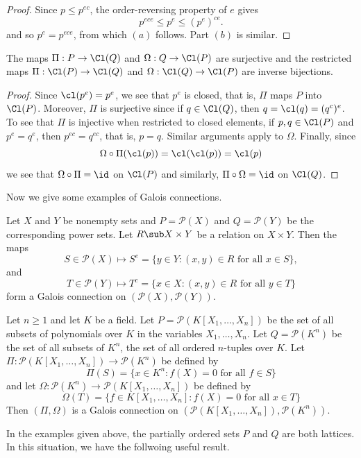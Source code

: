 \begin{proof}
Since $p\leq p^{ec}$, the order-reversing property of $e$ gives
\[p^{ece}\leq p^e\leq(p^{e})^{ce}.\]
and so $p^e=p^{ece}$, from which $(a)$ follows. Part $(b)$ is similar.
\end{proof}
\begin{theorem}
The maps $\Pi:P\to\Cl(Q)$ and $\Omega:Q\to\Cl(P)$ are surjective and the restricted maps $\Pi:\Cl(P)\to \Cl(Q)$ and $\Omega:\Cl(Q)\to\Cl(P)$ are inverse bijections.
\end{theorem}
\begin{proof}
Since $\cl(p^e)=p^e$, we see that $p^e$ is closed, that is, $\Pi$ maps $P$ into $\Cl(P)$. Moreover, $\Pi$ is surjective since if $q\in\Cl(Q)$, then $q=\cl(q)=(q^{c})^e$. To see that $\Pi$ is injective when restricted to closed elements, if $p,q\in\Cl(P)$ and $p^e=q^e$, then $p^{ec}=q^{ec}$, that is, $p=q$. Similar arguments apply to $\Omega$. Finally, since
\[\Omega\circ\Pi(\cl(p))=\cl(\cl(p))=\cl(p)\]
we see that $\Omega\circ\Pi=\id$ on $\Cl(P)$ and similarly, $\Pi\circ\Omega=\id$ on $\Cl(Q)$.
\end{proof}
Now we give some examples of Galois connections.
\begin{example}
Let $X$ and $Y$ be nonempty sets and $P=\mathscr{P}(X)$ and $Q=\mathscr{P}(Y)$ be the corresponding power sets. Let $R\sub X\times Y$ be a relation on $X\times Y$. Then the maps
\[S\in\mathscr{P}(X)\mapsto S^e=\{y\in Y:(x,y)\in R\text{ for all }x\in S\},\]
and
\[T\in\mathscr{P}(Y)\mapsto T^c=\{x\in X:(x,y)\in R\text{ for all }y\in T\}\]
form a Galois connection on $(\mathscr{P}(X),\mathscr{P}(Y))$.
\end{example}
\begin{example}
Let $n\geq 1$ and let $K$ be a field. Let $P=\mathscr{P}(K[X_1,\dots,X_n])$ be the set of all subsets of polynomials over $K$ in the variables $X_1,\dots,X_n$. Let $Q=\mathscr{P}(K^n)$ be the set of all subsets of $K^n$, the set of all ordered $n$-tuples over $K$. Let $\Pi:\mathscr{P}(K[X_1,\dots,X_n])\to\mathscr{P}(K^n)$ be defined by
\[\Pi(S)=\{x\in K^n:f(X)=0\text{ for all }f\in S\}\]
and let $\Omega:\mathscr{P}(K^n)\to\mathscr{P}(K[X_1,\dots,X_n])$ be defined by
\[\Omega(T)=\{f\in K[X_1,\dots,X_n]:f(X)=0\text{ for all }x\in T\}\]
Then $(\Pi,\Omega)$ is a Galois connection on $(\mathscr{P}(K[X_1,\dots,X_n]),\mathscr{P}(K^n))$.
\end{example}
In the examples given above, the partially ordered sets $P$ and $Q$ are both lattices. In this situation, we have the follwoing useful result.
